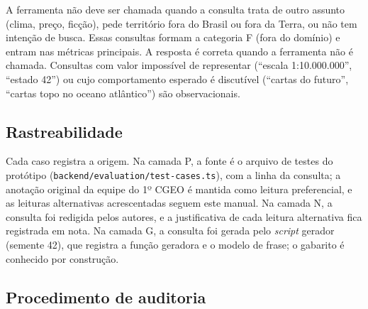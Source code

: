 A ferramenta não deve ser chamada quando a consulta trata de outro assunto (clima, preço, ficção), pede território fora do Brasil ou fora da Terra, ou não tem intenção de busca. Essas consultas formam a categoria F (fora do domínio) e entram nas métricas principais. A resposta é correta quando a ferramenta não é chamada. Consultas com valor impossível de representar (``escala 1:10.000.000'', ``estado 42'') ou cujo comportamento esperado é discutível (``cartas do futuro'', ``cartas topo no oceano atlântico'') são observacionais.

\subsection*{Rastreabilidade}

Cada caso registra a origem. Na camada P, a fonte é o arquivo de testes do protótipo (\texttt{backend/evaluation/test-cases.ts}), com a linha da consulta; a anotação original da equipe do 1º CGEO é mantida como leitura preferencial, e as leituras alternativas acrescentadas seguem este manual. Na camada N, a consulta foi redigida pelos autores, e a justificativa de cada leitura alternativa fica registrada em nota. Na camada G, a consulta foi gerada pelo \textit{script} gerador (semente 42), que registra a função geradora e o modelo de frase; o gabarito é conhecido por construção.

\subsection*{Procedimento de auditoria}


